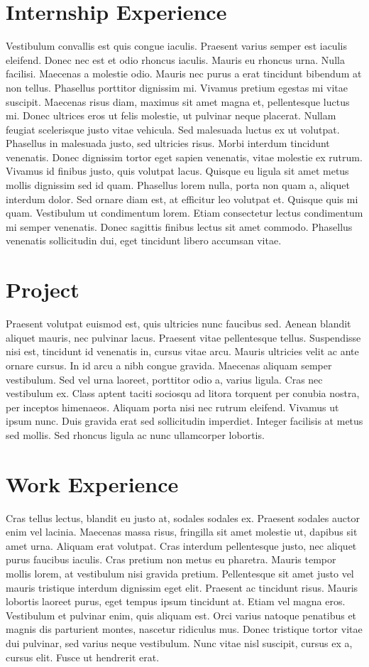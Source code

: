 \documentclass[12pt, letterpaper]{article}
\begin{document}
\section*{Internship Experience}
Vestibulum convallis est quis congue iaculis. Praesent varius semper est iaculis eleifend. Donec nec est et odio rhoncus iaculis. Mauris eu rhoncus urna. Nulla facilisi. Maecenas a molestie odio. Mauris nec purus a erat tincidunt bibendum at non tellus. Phasellus porttitor dignissim mi. Vivamus pretium egestas mi vitae suscipit. Maecenas risus diam, maximus sit amet magna et, pellentesque luctus mi. Donec ultrices eros ut felis molestie, ut pulvinar neque placerat. Nullam feugiat scelerisque justo vitae vehicula. Sed malesuada luctus ex ut volutpat. Phasellus in malesuada justo, sed ultricies risus. Morbi interdum tincidunt venenatis. Donec dignissim tortor eget sapien venenatis, vitae molestie ex rutrum. Vivamus id finibus justo, quis volutpat lacus. Quisque eu ligula sit amet metus mollis dignissim sed id quam. Phasellus lorem nulla, porta non quam a, aliquet interdum dolor. Sed ornare diam est, at efficitur leo volutpat et. Quisque quis mi quam. Vestibulum ut condimentum lorem. Etiam consectetur lectus condimentum mi semper venenatis. Donec sagittis finibus lectus sit amet commodo. Phasellus venenatis sollicitudin dui, eget tincidunt libero accumsan vitae.
\section*{Project}
Praesent volutpat euismod est, quis ultricies nunc faucibus sed. Aenean blandit aliquet mauris, nec pulvinar lacus. Praesent vitae pellentesque tellus. Suspendisse nisi est, tincidunt id venenatis in, cursus vitae arcu. Mauris ultricies velit ac ante ornare cursus. In id arcu a nibh congue gravida. Maecenas aliquam semper vestibulum. Sed vel urna laoreet, porttitor odio a, varius ligula. Cras nec vestibulum ex. Class aptent taciti sociosqu ad litora torquent per conubia nostra, per inceptos himenaeos. Aliquam porta nisi nec rutrum eleifend. Vivamus ut ipsum nunc. Duis gravida erat sed sollicitudin imperdiet. Integer facilisis at metus sed mollis. Sed rhoncus ligula ac nunc ullamcorper lobortis.

\section*{Work Experience}
Cras tellus lectus, blandit eu justo at, sodales sodales ex. Praesent sodales auctor enim vel lacinia. Maecenas massa risus, fringilla sit amet molestie ut, dapibus sit amet urna. Aliquam erat volutpat. Cras interdum pellentesque justo, nec aliquet purus faucibus iaculis. Cras pretium non metus eu pharetra. Mauris tempor mollis lorem, at vestibulum nisi gravida pretium. Pellentesque sit amet justo vel mauris tristique interdum dignissim eget elit. Praesent ac tincidunt risus. Mauris lobortis laoreet purus, eget tempus ipsum tincidunt at. Etiam vel magna eros. Vestibulum et pulvinar enim, quis aliquam est. Orci varius natoque penatibus et magnis dis parturient montes, nascetur ridiculus mus. Donec tristique tortor vitae dui pulvinar, sed varius neque vestibulum. Nunc vitae nisl suscipit, cursus ex a, cursus elit. Fusce ut hendrerit erat. 
\end{document}
